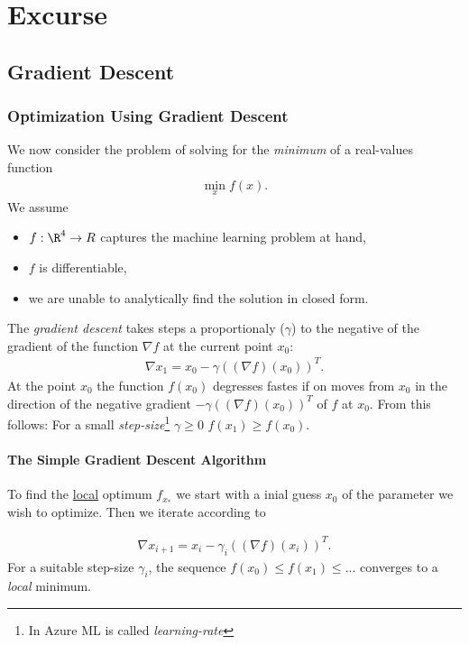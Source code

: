 \section{Excurse}
\subsection{Gradient Descent}
\subsubsection{Optimization Using Gradient Descent}
We now consider the problem of solving for the \textit{minimum} of a real-values function
\begin{align}
	\min_{x} f(x).
\end{align}
We assume
\begin{itemize}
	\item $f:\R^4 \rightarrow R$ captures the machine learning problem at hand,
	\item $f$ is differentiable,
	\item we are unable to analytically find the solution in closed form.
\end{itemize}
The \textit{gradient descent} takes steps a proportionaly ($\gamma$) to the negative of the gradient of the function $\nabla f$ at the current point $x_0$:
\begin{align}
	\nabla x_1 = x_0 - \gamma ((\nabla f)(x_0))^T.
\end{align}
At the point $x_0$ the function $f(x_0)$ degresses fastes if on moves from $x_0$ in the direction of the negative gradient $- \gamma ((\nabla f)(x_0))^T$ of $f$ at $x_0$. From this follows: For a small \textit{step-size}\footnote{In Azure ML is called \textit{learning-rate}} $\gamma \geq 0$ $f(x_1)\geq f(x_0)$.\\

\paragraph{The Simple Gradient Descent Algorithm}
To find the \underline{local} optimum $f_{x_*}$ we start with a inial guess $x_0$ of the parameter we wish to optimize. Then we iterate according to 

\begin{align}
	\nabla x_{i+1} = x_i - \gamma_i ((\nabla f)(x_i))^T.
\end{align}
For a suitable step-size $\gamma_i$, the sequence $f(x_0)\leq f(x_1) \leq ... $ converges to a \textit{local} minimum.

